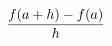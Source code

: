 \documentclass[preview]{standalone}
\begin{document}
\begin{align*}
\special{dvisvgm:raw <g id='unique000'>}\frac{f(a+h)-f(a)}{h}\special{dvisvgm:raw </g>}
\end{align*}
\end{document}
